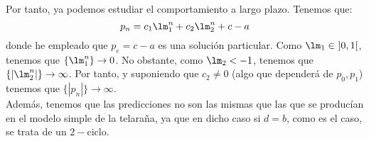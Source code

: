 \begin{ejercicio}
\begin{enumerate}
        Por tanto, ya podemos estudiar el comportamiento a largo plazo. Tenemos que:
        \begin{equation*}
            p_n = c_1 \lm_1^n + c_2\lm_2^n + c-a
        \end{equation*}
        donde he empleado que $p_e=c-a$ es una solución particular. Como $\lm_1\in~]0,1[$, tenemos que $\{\lm_1^n\}\to 0$. No obstante, como $\lm_2<-1$, tenemos que $\{|\lm_2^n|\}\to \infty$.
        Por tanto, y suponiendo que $c_2\neq 0$ (algo que dependerá de $p_0,p_1$) tenemos que $\{|p_n|\}\to \infty$.\\

        Además, tenemos que las predicciones no son las mismas que las que se producían en el modelo simple de la telaraña, ya que en dicho caso si $d=b$, como es el caso, se trata de un $2-$ciclo.
    \end{enumerate}
\end{ejercicio}

